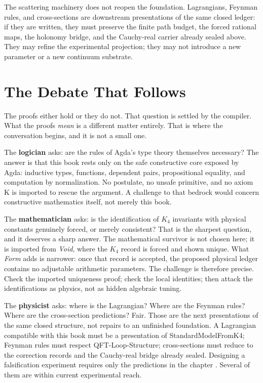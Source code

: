 \documentclass[11pt,a4paper]{book}
\def\texttt#1{#1}%
\begin{document}
The scattering machinery does not reopen the foundation. Lagrangians, Feynman rules, and cross-sections are downstream presentations of the same closed ledger: if they are written, they must preserve the finite path budget, the forced rational maps, the holonomy bridge, and the Cauchy-real carrier already sealed above. They may refine the experimental projection; they may not introduce a new parameter or a new continuum substrate.

\section*{The Debate That Follows}

The proofs either hold or they do not.  That question is settled by the
compiler.  What the proofs \emph{mean} is a different matter entirely.
That is where the conversation begins, and it is not a small one.

\medskip

The \textbf{logician} asks: are the rules of Agda's type theory themselves necessary? The answer is that this book rests only on the safe constructive core exposed by Agda: inductive types, functions, dependent pairs, propositional equality, and computation by normalization. No postulate, no unsafe primitive, and no axiom K is imported to rescue the argument. A challenge to that bedrock would concern constructive mathematics
itself, not merely this book.

The \textbf{mathematician} asks: is the identification of $K_4$ invariants with physical constants genuinely forced, or merely consistent? That is the sharpest question, and it deserves a sharp answer. The mathematical survivor is not chosen here; it is imported from \textit{Void}, where the $K_4$ record is forced and shown unique. What \textit{Form} adds is narrower: once that record is accepted, the proposed physical ledger contains no adjustable arithmetic parameters. The challenge is therefore precise. Check the imported uniqueness proof; check the local identities; then attack the identifications as physics, not as hidden algebraic tuning.

The \textbf{physicist} asks: where is the Lagrangian? Where are the Feynman rules? Where are the cross-section predictions? Fair. Those are the next presentations of the same closed structure, not repairs to an unfinished foundation. A Lagrangian compatible with this book must be a presentation of \texttt{StandardModelFromK4}; Feynman rules must respect \texttt{QFT-Loop-Structure}; cross-sections must reduce to the correction records and the Cauchy-real bridge already sealed. Designing a falsification experiment requires only the predictions in
the chapter \emph{}.  Several of them are within
current experimental reach.
\end{document}
